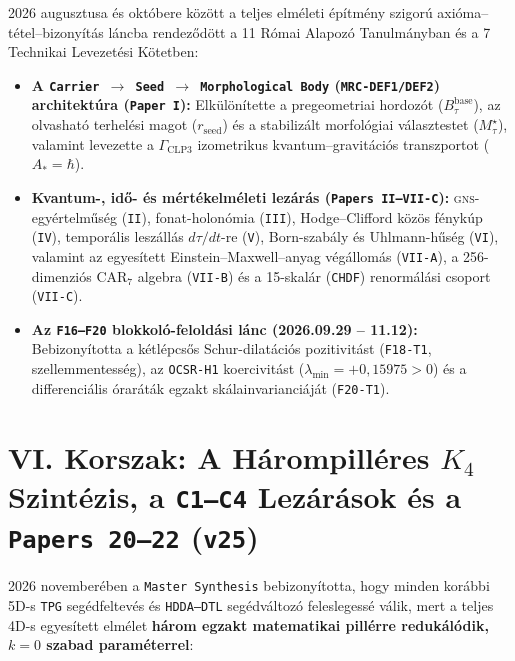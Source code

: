\documentclass[11pt,a4paper]{article}
\begin{document}
2026 augusztusa és októbere között a teljes elméleti építmény szigorú axióma--tétel--bizonyítás láncba rendez\H{o}dött a 11 Római Alapozó Tanulmányban és a 7 Technikai Levezetési Kötetben:
\begin{itemize}[leftmargin=1.5em]
\item \textbf{A \texttt{Carrier $\to$ Seed $\to$ Morphological Body} (\texttt{MRC-DEF1/DEF2}) architektúra (\texttt{Paper I}):} Elkülönítette a pregeometriai hordozót ($B_\tau^{\mathrm{base}}$), az olvasható terhelési magot ($r_{\mathrm{seed}}$) és a stabilizált morfológiai választestet ($M_\tau^\star$), valamint levezette a $\Gamma_{\mathrm{CLP3}}$ izometrikus kvantum--gravitációs transzportot ($A_* = \hbar$).
\item \textbf{Kvantum-, id\H{o}- és mértékelméleti lezárás (\texttt{Papers II--VII-C}):} \textsc{gns}-egyértelm\H{u}ség (\texttt{II}), fonat-holonómia (\texttt{III}), Hodge--Clifford közös fénykúp (\texttt{IV}), temporális leszállás $d\tau/dt$-re (\texttt{V}), Born-szabály és Uhlmann-h\H{u}ség (\texttt{VI}), valamint az egyesített Einstein--Maxwell--anyag végállomás (\texttt{VII-A}), a 256-dimenziós $\mathrm{CAR}_7$ algebra (\texttt{VII-B}) és a 15-skalár (\texttt{CHDF}) renormálási csoport (\texttt{VII-C}).
\item \textbf{Az \texttt{F16--F20} blokkoló-feloldási lánc (2026.09.29 -- 11.12):} Bebizonyította a kétlépcs\H{o}s Schur-dilatációs pozitivitást (\texttt{F18-T1}, szellemmentesség), az \texttt{OCSR-H1} koercivitást ($\lambda_{\min} = +0{,}15975 > 0$) és a differenciális óraráták egzakt skálainvarianciáját (\texttt{F20-T1}).
\end{itemize}

\section{VI. Korszak: A Hárompilléres $K_4$ Szintézis, a \texttt{C1--C4} Lezárások és a \texttt{Papers 20--22} (\texttt{v25})}

2026 novemberében a \texttt{Master Synthesis} bebizonyította, hogy minden korábbi 5D-s \texttt{TPG} segédfeltevés és \texttt{HDDA--DTL} segédváltozó feleslegessé válik, mert a teljes 4D-s egyesített elmélet \textbf{három egzakt matematikai pillérre redukálódik, $k = 0$ szabad paraméterrel}:
\end{document}
